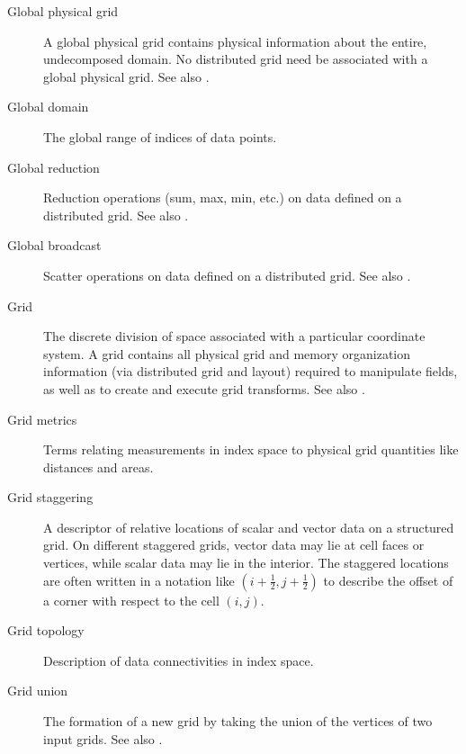 \begin{description}
\item[Global physical grid] \label{glos:GlobPhysGrid} 
  A global physical grid contains physical information about the entire, 
  undecomposed domain.  No distributed grid need be associated with a global 
  physical grid. See also .  

\item[Global domain] \label{glos:GlobDomain}
  The global range of indices of data points.

\item[Global reduction] \label{glos:GlobReduction} 
  Reduction operations (sum, max, min, etc.) on data defined on a distributed 
  grid.  See also .

\item[Global broadcast] \label{glos:GlobBroadcast}
  Scatter operations on data defined on a distributed grid.
  See also .

\item[Grid] \label{glos:Grid} The discrete division of space associated with
  a particular coordinate system.  A grid contains all physical grid and memory 
  organization information (via distributed grid and layout) required to manipulate 
  fields, as well as to create and execute grid transforms. 
  See also . 

\item[Grid metrics] \label{glos:GridMetrics} Terms relating measurements 
  in index space to physical grid quantities like distances and areas.

\item[Grid staggering] \label{glos:GridStagger} 
  A descriptor of relative locations
  of scalar and vector data on a structured grid. On different
  staggered grids, vector data may lie at cell faces or vertices,
  while scalar data may lie in the interior. The staggered locations
  are often written in a notation like $(i+\frac12,j+\frac12)$ to
  describe the offset of a corner with respect to the cell $(i,j)$.

\item[Grid topology] \label{glos:GridTopo} Description of data 
  connectivities in index space.

\item[Grid union] \label{glos:GridUnion} The formation of a new grid
  by taking the union of the vertices of two input grids.
  See also . 


\end{description}
